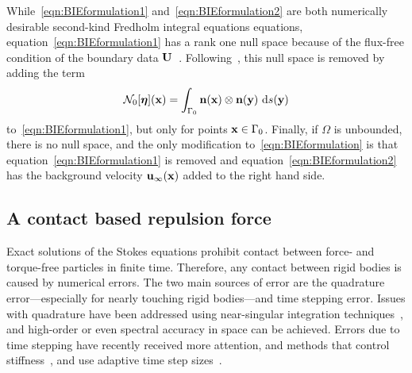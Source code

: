 \documentclass[preprint, 10pt]{elsarticle}
\begin{document}
While~\eqref{eqn:BIEformulation1} and~\eqref{eqn:BIEformulation2} are
both numerically desirable second-kind Fredholm integral equations
equations, equation~\eqref{eqn:BIEformulation1} has a rank one null
space because of the flux-free condition of the boundary data
${\mathbf{U}}$~\cite{Ladyzhenskaya1963}.  Following~\cite{Power1993}, this null
space is removed by adding the term 
\begin{align}
\label{eqn:N0_modification} 
  \mathcal{N}_0[{\boldsymbol\eta}]({\mathbf{x}}) = \int_{\Gamma_0} 
    {\mathbf{n}}({\mathbf{x}})\otimes{\mathbf{n}}({\mathbf{y}})~\text{d}s({\mathbf{y}})
\end{align}
to~\eqref{eqn:BIEformulation1}, but only for points ${\mathbf{x}} \in \Gamma_0$.
Finally, if $\Omega$ is unbounded, there is no null space, and
the only modification to~\eqref{eqn:BIEformulation} is that
equation~\eqref{eqn:BIEformulation1} is removed and
equation~\eqref{eqn:BIEformulation2} has the background velocity
${\mathbf{u}}_\infty({\mathbf{x}})$ added to the right hand side.


\subsection{A contact based repulsion force}
\label{sec:repulsion}
Exact solutions of the Stokes equations prohibit contact between
force- and torque-free particles in finite time.  Therefore, any
contact between rigid bodies is caused by numerical errors.  The two main sources of error are
the quadrature error---especially for nearly touching rigid bodies---and
time stepping error.  Issues with quadrature have been addressed using
near-singular integration techniques~\cite{Ying2006, Klockner2013,
Quaife2014, Barnett2015, Beale2001, Cortez2001},
and high-order or even spectral accuracy in space can be achieved.
Errors due to time stepping have recently received more attention, and
methods that control stiffness~\cite{Quaife2014}, and use adaptive time step
sizes~\cite{Kropinski1999,
Quaife2015, Sorgentone2018}.

\end{document}
